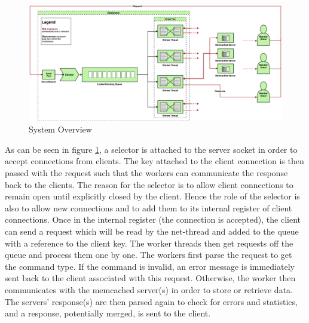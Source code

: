 \documentclass[11pt,a4paper]{article}
\begin{document}
\begin{figure}[h]
    \centering
    \includegraphics[width=\textwidth]{processing/graphics/system_overview.png}
    \caption{System Overview}
    \label{png::system_overview}
\end{figure}

As can be seen in figure \ref{png::system_overview}, a selector is attached to the server socket in order to accept connections from clients. The key attached to the client connection is then passed with the request such that the workers can communicate the response back to the clients. The reason for the selector is to allow client connections to remain open until explicitly closed by the client. Hence the role of the selector is also to allow new connections and to add them to its internal register of client connections. Once in the internal register (the connection is accepted), the client can send a request which will be read by the net-thread and added to the queue with a reference to the client key. The worker threads then get requests off the queue and process them one by one. The workers first parse the request to get the command type. If the command is invalid, an error message is immediately sent back to the client associated with this request. Otherwise, the worker then communicates with the memcached server(s) in order to store or retrieve data. The servers' response(s) are then parsed again to check for errors and statistics, and a response, potentially merged, is sent to the client.
\end{document}
